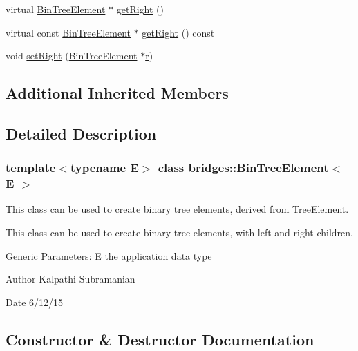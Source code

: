 \begin{DoxyCompactItemize}
\item 
virtual \mbox{\hyperlink{classbridges_1_1_bin_tree_element}{Bin\+Tree\+Element}} $\ast$ \mbox{\hyperlink{classbridges_1_1_bin_tree_element_a5751f2fe38e2364f68dc37939fce060f}{get\+Right}} ()
\item 
virtual const \mbox{\hyperlink{classbridges_1_1_bin_tree_element}{Bin\+Tree\+Element}} $\ast$ \mbox{\hyperlink{classbridges_1_1_bin_tree_element_aa01980f4be18f6c205580ea0376a0d07}{get\+Right}} () const
\item 
void \mbox{\hyperlink{classbridges_1_1_bin_tree_element_a0131f6ecefc7f68c6502d97292ea43bf}{set\+Right}} (\mbox{\hyperlink{classbridges_1_1_bin_tree_element}{Bin\+Tree\+Element}} $\ast$\mbox{\hyperlink{namespacebridges_acfb0a4f7877d8f63de3e6862004c50eda4b43b0aee35624cd95b910189b3dc231}{r}})
\end{DoxyCompactItemize}
\subsection*{Additional Inherited Members}


\subsection{Detailed Description}
\subsubsection*{template$<$typename E$>$\newline
class bridges\+::\+Bin\+Tree\+Element$<$ E $>$}

This class can be used to create binary tree elements, derived from \mbox{\hyperlink{classbridges_1_1_tree_element}{Tree\+Element}}. 

This class can be used to create binary tree elements, with left and right children.

Generic Parameters\+: E the application data type

\begin{DoxyAuthor}{Author}
Kalpathi Subramanian 
\end{DoxyAuthor}
\begin{DoxyDate}{Date}
6/12/15 
\end{DoxyDate}


\subsection{Constructor \& Destructor Documentation}
\mbox{\label{classbridges_1_1_bin_tree_element_a1c60db90bda9ecd3f5a61b5f33f49173}} 
